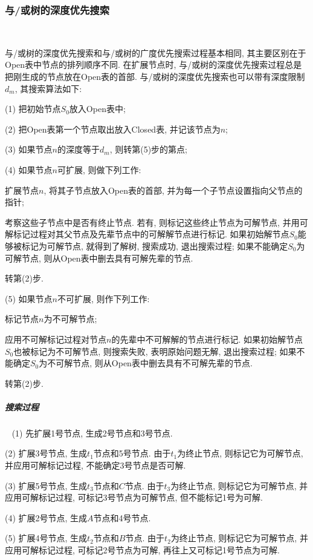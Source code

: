 \subsubsection{与/或树的深度优先搜索}~{}

与/或树的深度优先搜索和与/或树的广度优先搜索过程基本相同, 其主要区别在于Open表中节点的排列顺序不同. 在扩展节点时, 与/或树的深度优先搜索过程总是把刚生成的节点放在Open表的首部.
与/或树的深度优先搜索也可以带有深度限制$d_m$, 其搜索算法如下:

(1) 把初始节点$S_0$放入Open表中;

(2) 把Open表第一个节点取出放入Closed表, 并记该节点为$n$;

(3) 如果节点$n$的深度等于$d_m$, 则转第(5)步的第点;

(4) 如果节点$n$可扩展, 则做下列工作:

    扩展节点$n$, 将其子节点放入Open表的首部, 并为每一个子节点设置指向父节点的指针;

     考察这些子节点中是否有终止节点. 若有, 则标记这些终止节点为可解节点, 并用可解标记过程对其父节点及先辈节点中的可解解节点进行标记.
    如果初始解节点$S_0$能够被标记为可解节点, 就得到了解树, 搜索成功, 退出搜索过程; 如果不能确定$S_0$为可解节点, 则从Open表中删去具有可解先辈的节点.

    转第(2)步.

(5) 如果节点$n$不可扩展, 则作下列工作:

   \quad{} 标记节点$n$为不可解节点;

   \quad{} 应用不可解标记过程对节点$n$的先辈中不可解解的节点进行标记. 如果初始解节点$S_0$也被标记为不可解节点, 则搜索失败, 表明原始问题无解, 退出搜索过程; 如果不能确定$S_0$为不可解节点, 则从Open表中删去具有不可解先辈的节点.

   \quad{} 转第(2)步.
\subparagraph{搜索过程}~{}
(1) 先扩展1号节点, 生成2号节点和3号节点.

(2) 扩展3号节点, 生成$t_1$节点和5号节点. 由于$t_1$为终止节点, 则标记它为可解节点, 并应用可解标记过程, 不能确定3号节点是否可解.

(3) 扩展5号节点, 生成$t_3$节点和$C$节点. 由于$t_3$为终止节点, 则标记它为可解节点, 并应用可解标记过程, 可标记3号节点为可解节点, 但不能标记1号为可解.

(4) 扩展2号节点, 生成$A$节点和4号节点.

(5) 扩展4号节点, 生成$t_2$节点和$B$节点. 由于$t_2$为终止节点, 则标记它为可解节点, 并应用可解标记过程, 可标记2号节点为可解, 再往上又可标记1号节点为可解.

